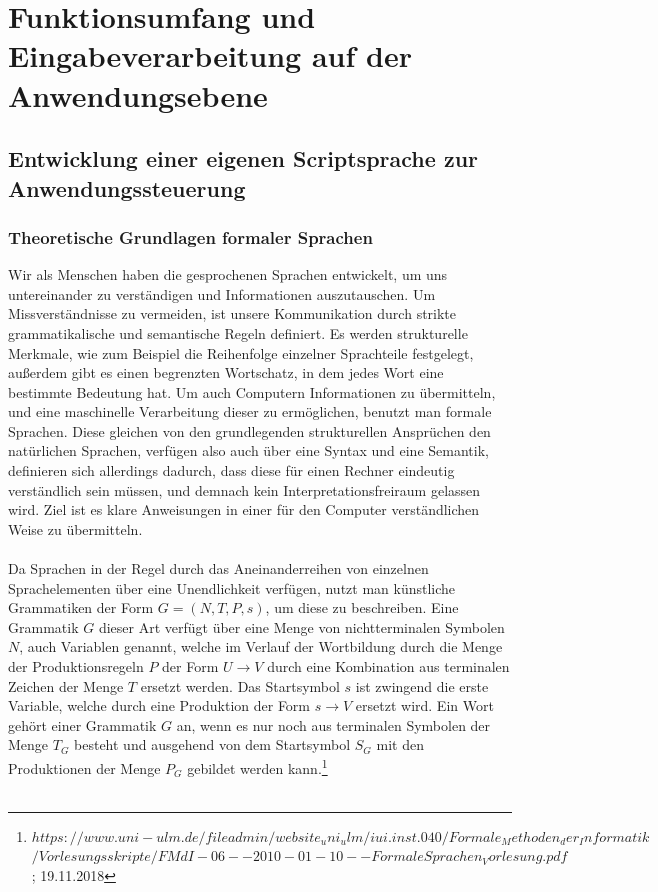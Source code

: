%
%
%
\section{Funktionsumfang und Eingabeverarbeitung auf der Anwendungsebene}

\subsection{Entwicklung einer eigenen Scriptsprache zur Anwendungssteuerung}
\subsubsection{Theoretische Grundlagen formaler Sprachen}
Wir als Menschen haben die gesprochenen Sprachen entwickelt, um uns untereinander zu verständigen und Informationen auszutauschen. 
Um Missverständnisse zu vermeiden, ist unsere Kommunikation durch strikte grammatikalische und semantische Regeln definiert. 
Es werden strukturelle Merkmale, wie zum Beispiel die Reihenfolge einzelner Sprachteile festgelegt, außerdem gibt es einen begrenzten Wortschatz, in dem jedes Wort eine bestimmte Bedeutung hat.
Um auch Computern Informationen zu übermitteln, und eine maschinelle Verarbeitung dieser zu ermöglichen, benutzt man formale Sprachen. 
Diese gleichen von den grundlegenden strukturellen Ansprüchen den natürlichen Sprachen, verfügen also auch über eine Syntax und eine Semantik, definieren sich allerdings dadurch, dass diese für einen Rechner eindeutig verständlich sein müssen, und demnach kein Interpretationsfreiraum gelassen wird. Ziel ist es klare Anweisungen in einer für den Computer verständlichen Weise zu übermitteln.\\\\
Da Sprachen in der Regel durch das Aneinanderreihen von einzelnen Sprachelementen über eine Unendlichkeit verfügen, nutzt man künstliche Grammatiken der Form $G = (N, T, P, s)$, um diese zu beschreiben. 
Eine Grammatik $G$ dieser Art verfügt über eine Menge von nichtterminalen Symbolen $N$, auch Variablen genannt, welche im Verlauf der Wortbildung durch die Menge der Produktionsregeln $P$ der Form $U \rightarrow V$ durch eine Kombination aus terminalen Zeichen der Menge $T$ ersetzt werden. 
Das Startsymbol $s$ ist zwingend die erste Variable, welche durch eine Produktion der Form $s \rightarrow V$ ersetzt wird. 
Ein Wort gehört einer Grammatik $G$ an, wenn es nur noch aus terminalen Symbolen der Menge $T_G$ besteht und ausgehend von dem Startsymbol $S_G$ mit den Produktionen der Menge $P_G$ gebildet werden kann.\footnote{$	https://www.uni-ulm.de/fileadmin/website_uni_ulm/iui.inst.040/Formale_Methoden_der_Informatik$\\$/Vorlesungsskripte/FMdI-06--2010-01-10--FormaleSprachen_Vorlesung.pdf$
; 19.11.2018}\\\\
